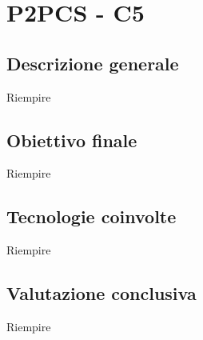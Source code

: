 \section{P2PCS - C5} \label{c5}
    \subsection{Descrizione generale}
    Riempire

    \subsection{Obiettivo finale}
    Riempire

    \subsection{Tecnologie coinvolte}
    Riempire

    \subsection{Valutazione conclusiva}
    Riempire
